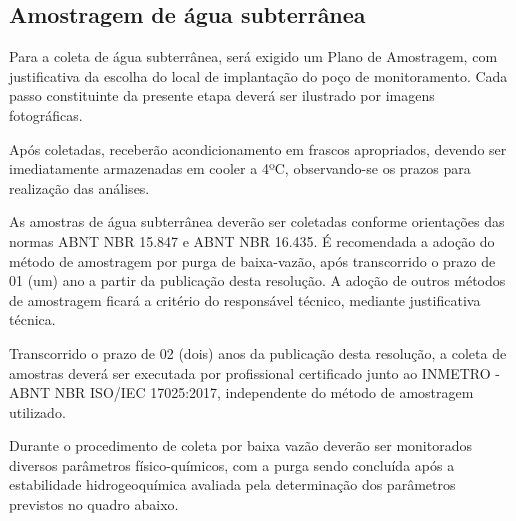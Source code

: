 \subsection{Amostragem de água subterrânea}

Para a coleta de água subterrânea, será exigido um Plano de 
Amostragem, com justificativa da escolha do local de 
implantação do poço de monitoramento. Cada passo 
constituinte da presente etapa deverá ser ilustrado por 
imagens fotográficas.

Após coletadas, receberão acondicionamento em frascos 
apropriados, devendo ser imediatamente armazenadas em 
cooler a 4ºC, observando-se os prazos para realização das 
análises.

As amostras de água subterrânea deverão ser coletadas 
conforme orientações das normas ABNT NBR 15.847 e ABNT NBR 
16.435. É recomendada a adoção do método de amostragem por 
purga de baixa-vazão, após transcorrido o prazo de 01 (um) 
ano a partir da publicação desta resolução. A adoção de 
outros métodos de amostragem ficará a critério do 
responsável técnico, mediante justificativa técnica.

Transcorrido o prazo de 02 (dois) anos da publicação desta 
resolução, a coleta de amostras deverá ser executada por 
profissional certificado junto ao INMETRO - ABNT NBR 
ISO/IEC 17025:2017, independente do método de amostragem 
utilizado.

Durante o procedimento de coleta por baixa vazão deverão 
ser monitorados diversos parâmetros físico-químicos, com a 
purga sendo concluída após a estabilidade hidrogeoquímica 
avaliada pela determinação dos parâmetros previstos no 
quadro abaixo.